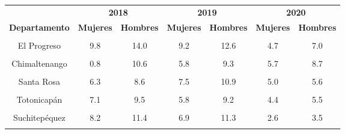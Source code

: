 \begin{tabular}[t]{ccccccc}
\toprule
\multicolumn{1}{c}{\textbf{ }} & \multicolumn{2}{c}{\textbf{2018}} & \multicolumn{2}{c}{\textbf{2019}} & \multicolumn{2}{c}{\textbf{2020}} \\
\cmidrule(l{3pt}r{3pt}){2-3} \cmidrule(l{3pt}r{3pt}){4-5} \cmidrule(l{3pt}r{3pt}){6-7}
\textbf{Departamento} & \textbf{Mujeres} & \textbf{Hombres} & \textbf{Mujeres} & \textbf{Hombres} & \textbf{Mujeres} & \textbf{Hombres}\\
\midrule
\cellcolor[HTML]{B6B3FF}{Guatemala} & \cellcolor[HTML]{B6B3FF}{8.6} & \cellcolor[HTML]{B6B3FF}{13.4} & \cellcolor[HTML]{B6B3FF}{7.9} & \cellcolor[HTML]{B6B3FF}{12.9} & \cellcolor[HTML]{B6B3FF}{5.9} & \cellcolor[HTML]{B6B3FF}{9.4}\\
El Progreso & 9.8 & 14.0 & 9.2 & 12.6 & 4.7 & 7.0\\
\cellcolor[HTML]{B6B3FF}{Sacatepéquez} & \cellcolor[HTML]{B6B3FF}{7.8} & \cellcolor[HTML]{B6B3FF}{12.1} & \cellcolor[HTML]{B6B3FF}{6.4} & \cellcolor[HTML]{B6B3FF}{10.9} & \cellcolor[HTML]{B6B3FF}{3.4} & \cellcolor[HTML]{B6B3FF}{6.8}\\
Chimaltenango & 0.8 & 10.6 & 5.8 & 9.3 & 5.7 & 8.7\\
\cellcolor[HTML]{B6B3FF}{Escuintla} & \cellcolor[HTML]{B6B3FF}{9.3} & \cellcolor[HTML]{B6B3FF}{12.2} & \cellcolor[HTML]{B6B3FF}{8.3} & \cellcolor[HTML]{B6B3FF}{11.1} & \cellcolor[HTML]{B6B3FF}{3.3} & \cellcolor[HTML]{B6B3FF}{4.6}\\
Santa Rosa & 6.3 & 8.6 & 7.5 & 10.9 & 5.0 & 5.6\\
\cellcolor[HTML]{B6B3FF}{Sololá} & \cellcolor[HTML]{B6B3FF}{5.8} & \cellcolor[HTML]{B6B3FF}{9.0} & \cellcolor[HTML]{B6B3FF}{4.1} & \cellcolor[HTML]{B6B3FF}{7.7} & \cellcolor[HTML]{B6B3FF}{4.7} & \cellcolor[HTML]{B6B3FF}{6.6}\\
Totonicapán & 7.1 & 9.5 & 5.8 & 9.2 & 4.4 & 5.5\\
\cellcolor[HTML]{B6B3FF}{Quetzaltenango} & \cellcolor[HTML]{B6B3FF}{6.3} & \cellcolor[HTML]{B6B3FF}{9.2} & \cellcolor[HTML]{B6B3FF}{5.4} & \cellcolor[HTML]{B6B3FF}{7.6} & \cellcolor[HTML]{B6B3FF}{3.4} & \cellcolor[HTML]{B6B3FF}{4.7}\\
Suchitepéquez & 8.2 & 11.4 & 6.9 & 11.3 & 2.6 & 3.5\\
\cellcolor[HTML]{B6B3FF}{Retalhuleu} & \cellcolor[HTML]{B6B3FF}{7.5} & \cellcolor[HTML]{B6B3FF}{9.8} & \cellcolor[HTML]{B6B3FF}{7.0} & \cellcolor[HTML]{B6B3FF}{9.3} & \cellcolor[HTML]{B6B3FF}{5.3} & \cellcolor[HTML]{B6B3FF}{6.9}\\

\end{tabular}
